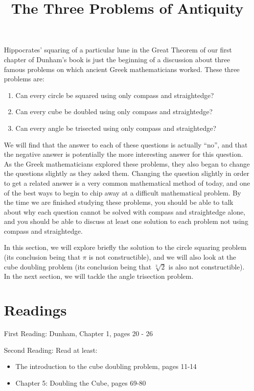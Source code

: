\documentclass{ximera}
\title{The Three Problems of Antiquity}
\begin{document}
\begin{abstract}
\end{abstract}
\maketitle

Hippocrates' squaring of a particular lune in the Great Theorem of our first chapter 
of Dunham's book is just the beginning of a discussion about three famous problems 
on which ancient Greek mathematicians worked.  These three problems are:
\begin{enumerate}
	\item Can every circle be squared using only compass and straightedge?
	\item Can every cube be doubled using only compass and straightedge?
	\item Can every angle be trisected using only compass and straightedge?
\end{enumerate}
We will find that the answer to each of these questions is actually ``no'', and that 
the negative answer is potentially the more interesting answer for this question.  As 
the Greek mathematicians explored these problems, they also began to change the questions 
slightly as they asked them.  Changing the question slightly in order to get a related 
answer is a very common mathematical method of today, and one of the best ways to begin 
to chip away at a difficult mathematical problem.  By the time we are finished studying 
these problems, you should be able to talk about why each question cannot be solved with 
compass and straightedge alone, and you should be able to discuss at least one solution 
to each problem not using compass and straightedge.

In this section, we will explore briefly the solution to the circle squaring problem 
(its conclusion being that $\pi$ is not constructible), and we will also look at the cube 
doubling problem (its conclusion being that $\sqrt[3]{2}$ is also not constructible).  In 
the next section, we will tackle the angle trisection problem.



\section{Readings}

First Reading: Dunham, Chapter 1, pages 20 - 26

Second Reading: 
Read at least:
\begin{itemize}
	\item The introduction to the cube doubling problem, pages 11-14
	\item Chapter 5: Doubling the Cube, pages 69-80
\end{itemize}
\end{document}
